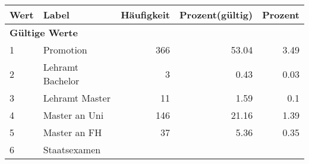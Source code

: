      \begin{longtable}{lXrrr}
     \toprule
     \textbf{Wert} & \textbf{Label} & \textbf{Häufigkeit} & \textbf{Prozent(gültig)} & \textbf{Prozent} \\
     \endhead
     \midrule
     \multicolumn{5}{l}{\textbf{Gültige Werte}}\\

     1 &
     \multicolumn{1}{X}{ Promotion   } &


       \num{366} &
       \num[round-mode=places,round-precision=2]{53.04} &
         \num[round-mode=places,round-precision=2]{3.49} \\

     2 &
     \multicolumn{1}{X}{ Lehramt Bachelor   } &


       \num{3} &
       \num[round-mode=places,round-precision=2]{0.43} &
         \num[round-mode=places,round-precision=2]{0.03} \\

     3 &
     \multicolumn{1}{X}{ Lehramt Master   } &


       \num{11} &
       \num[round-mode=places,round-precision=2]{1.59} &
         \num[round-mode=places,round-precision=2]{0.1} \\

     4 &
     \multicolumn{1}{X}{ Master an Uni   } &


       \num{146} &
       \num[round-mode=places,round-precision=2]{21.16} &
         \num[round-mode=places,round-precision=2]{1.39} \\

     5 &
     \multicolumn{1}{X}{ Master an FH   } &


       \num{37} &
       \num[round-mode=places,round-precision=2]{5.36} &
         \num[round-mode=places,round-precision=2]{0.35} \\

     6 &
     \multicolumn{1}{X}{ Staatsexamen   } &



\end{longtable}
